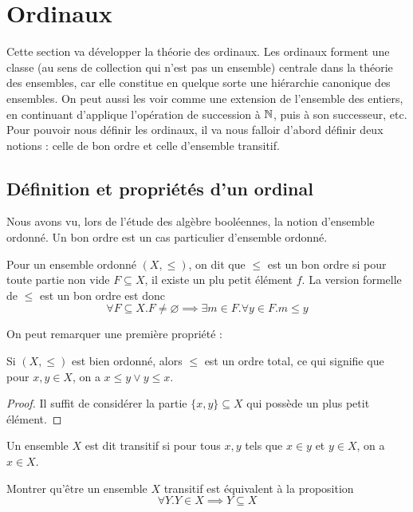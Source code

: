 \section{Ordinaux}

Cette section va développer la théorie des ordinaux. Les ordinaux forment une classe (au sens de collection qui n'est pas un ensemble) centrale dans la théorie des ensembles, car elle constitue en quelque sorte une hiérarchie canonique des ensembles. On peut aussi les voir comme une extension de l'ensemble des entiers, en continuant d'applique l'opération de succession à $\mathbb{N}$, puis à son successeur, etc. Pour pouvoir nous définir les ordinaux, il va nous falloir d'abord définir deux notions : celle de bon ordre et celle d'ensemble transitif.

\subsection{Définition et propriétés d'un ordinal}

Nous avons vu, lors de l'étude des algèbre booléennes, la notion d'ensemble ordonné. Un bon ordre est un cas particulier d'ensemble ordonné.

\begin{defi}
    Pour un ensemble ordonné $(X,\leq)$, on dit que $\leq$ est un bon ordre si pour toute partie non vide $F\subseteq X$, il existe un plu petit élément $f$. La version formelle de \og $\leq$ est un bon ordre\fg{} est donc $$\forall F\subseteq X. F\neq \varnothing \implies \exists m\in F. \forall y\in F. m\leq y$$
\end{defi}

On peut remarquer une première propriété :

\begin{prop}
    Si $(X,\leq)$ est bien ordonné, alors $\leq$ est un ordre total, ce qui signifie que pour $x,y\in X$, on a $x\leq y \lor y\leq x$.
\end{prop}

\begin{proof}
    Il suffit de considérer la partie $\{x,y\}\subseteq X$ qui possède un plus petit élément.
\end{proof}

\begin{defi}
    Un ensemble $X$ est dit transitif si pour tous $x,y$ tels que $x\in y$ et $y\in X$, on a $x\in X$.
\end{defi}

\begin{exo}
    Montrer qu'être un ensemble $X$ transitif est équivalent à la proposition $$\forall Y. Y\in X \implies Y\subseteq X$$
\end{exo}

